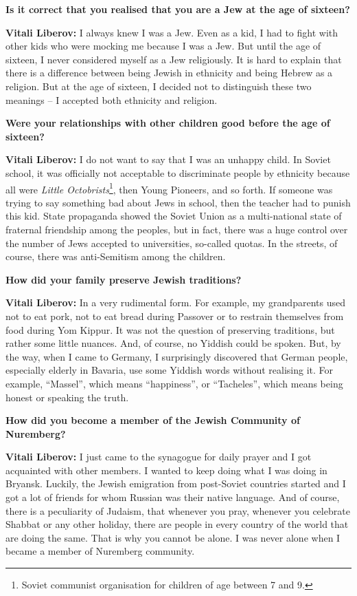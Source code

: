 \textbf{Is it correct that you realised that you are a Jew at the age of sixteen?} 

\textbf{Vitali Liberov:} I always knew I was a Jew. Even as a kid, I had to fight with other kids who were mocking me because I was a Jew. But until the age of sixteen, I never considered myself as a Jew religiously. It is hard to explain that there is a difference between being Jewish in ethnicity and being Hebrew as a religion. But at the age of sixteen, I decided not to distinguish these two meanings – I accepted both ethnicity and religion.  

\textbf{Were your relationships with other children good before the age of sixteen?} 

\textbf{Vitali Liberov:} I do not want to say that I was an unhappy child. In Soviet school, it was officially not acceptable to discriminate people by ethnicity because all were \textit{Little Octobrists}\footnote{Soviet communist organisation for children of age between 7 and 9.}, then Young Pioneers, and so forth. If someone was trying to say something bad about Jews in school, then the teacher had to punish this kid. State propaganda showed the Soviet Union as a multi-national state of fraternal friendship among the peoples, but in fact, there was a huge control over the number of Jews accepted to universities, so-called quotas. In the streets, of course, there was anti-Semitism among the children.  

\textbf{How did your family preserve Jewish traditions?} 

\textbf{Vitali Liberov:} In a very rudimental form. For example, my grandparents used not to eat pork, not to eat bread during Passover or to restrain themselves from food during Yom Kippur. It was not the question of preserving traditions, but rather some little nuances. And, of course, no Yiddish could be spoken. But, by the way, when I came to Germany, I surprisingly discovered that German people, especially elderly in Bavaria, use some Yiddish words without realising it. For example, ``Massel'', which means ``happiness'', or ``Tacheles'', which means being honest or speaking the truth.  

\textbf{How did you become a member of the Jewish Community of Nuremberg?} 

\textbf{Vitali Liberov:} I just came to the synagogue for daily prayer and I got acquainted with other members. I wanted to keep doing what I was doing in Bryansk. Luckily, the Jewish emigration from post-Soviet countries started and I got a lot of friends for whom Russian was their native language. And of course, there is a peculiarity of Judaism, that whenever you pray, whenever you celebrate Shabbat or any other holiday, there are people in every country of the world that are doing the same. That is why you cannot be alone. I was never alone when I became a member of Nuremberg community.  

